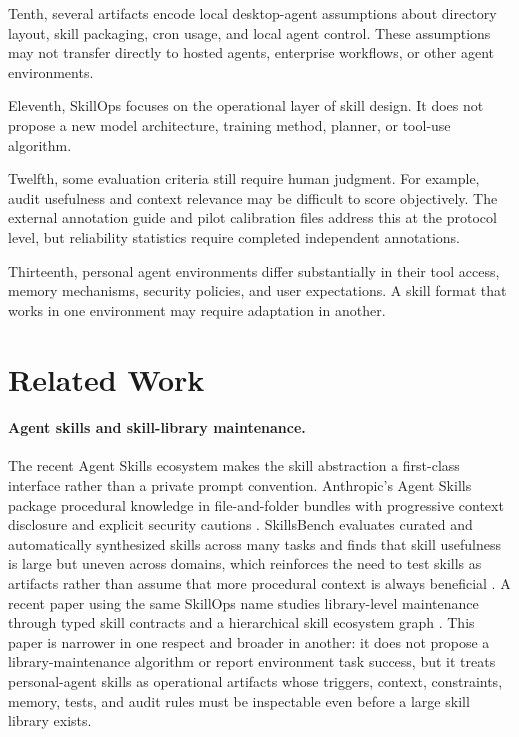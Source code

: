 \documentclass[11pt]{article}
\begin{document}
Tenth, several artifacts encode local desktop-agent assumptions about directory
layout, skill packaging, cron usage, and local agent control. These assumptions
may not transfer directly to hosted agents, enterprise workflows, or other
agent environments.

Eleventh, SkillOps focuses on the operational layer of skill design. It does not
propose a new model architecture, training method, planner, or tool-use
algorithm.

Twelfth, some evaluation criteria still require human judgment. For example,
audit usefulness and context relevance may be difficult to score objectively.
The external annotation guide and pilot calibration files address this at the
protocol level, but reliability statistics require completed independent
annotations.

Thirteenth, personal agent environments differ substantially in their tool access,
memory mechanisms, security policies, and user expectations. A skill format
that works in one environment may require adaptation in another.

\section{Related Work}

\paragraph{Agent skills and skill-library maintenance.}

The recent Agent Skills ecosystem makes the skill abstraction a first-class
interface rather than a private prompt convention. Anthropic's Agent Skills
package procedural knowledge in file-and-folder bundles with progressive
context disclosure and explicit security cautions
\citep{anthropic2025agentskills}. SkillsBench evaluates curated and
automatically synthesized skills across many tasks and finds that skill usefulness is
large but uneven across domains, which reinforces the need to test skills as
artifacts rather than assume that more procedural context is always beneficial
\citep{li2026skillsbench}. A recent paper using the same SkillOps name studies
library-level maintenance through typed skill contracts and a hierarchical skill
ecosystem graph \citep{pu2026skillops}. This paper is narrower in one respect
and broader in another: it does not propose a library-maintenance algorithm or
report environment task success, but it treats personal-agent skills as
operational artifacts whose triggers, context, constraints, memory, tests, and
audit rules must be inspectable even before a large skill library exists.
\end{document}
